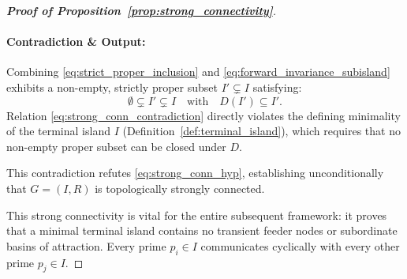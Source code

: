 \documentclass[11pt,a4paper]{article}
\theoremstyle{definition}
\begin{document}
\begin{proof}[\textbf{Proof of Proposition~\ref{prop:strong_connectivity}}]
\paragraph{Contradiction \& Output:}
Combining \eqref{eq:strict_proper_inclusion} and \eqref{eq:forward_invariance_subisland} exhibits a non-empty, strictly proper subset $I' \subsetneq I$ satisfying:
\begin{equation}
\label{eq:strong_conn_contradiction}
\emptyset \subsetneq I' \subsetneq I \quad \text{with} \quad D(I') \subseteq I'.
\end{equation}
Relation \eqref{eq:strong_conn_contradiction} directly violates the defining minimality of the terminal island $I$ (Definition~\ref{def:terminal_island}), which requires that no non-empty proper subset can be closed under $D$.

This contradiction refutes \eqref{eq:strong_conn_hyp}, establishing unconditionally that $G = (I, R)$ is topologically strongly connected.

This strong connectivity is vital for the entire subsequent framework: it proves that a minimal terminal island contains no transient feeder nodes or subordinate basins of attraction. Every prime $p_i \in I$ communicates cyclically with every other prime $p_j \in I$.
\end{proof}
\end{document}
